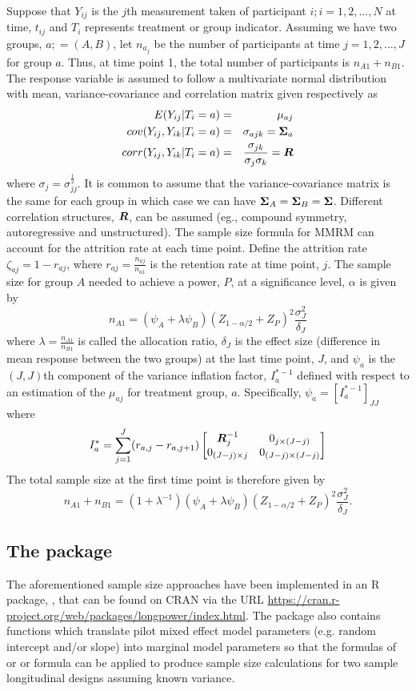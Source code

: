 Suppose that $Y_{ij}$ is the $j$th measurement taken of participant $i; i=1,2,\dots,N$ at time, $t_{ij}$ and $T_i$ represents treatment or group indicator. Assuming we have two groups, $a; =(A,B)$, let $n_{a_j}$ be the number of participants at time $j=1,2,\dots,J$ for group $a$. Thus, at time point 1, the total number of participants is $n_{A1}+n_{B1}$.
The response variable is assumed to follow a multivariate normal distribution with mean, variance-covariance and correlation matrix given respectively as 
\begin{eqnarray*}
E(Y_{ij}|T_i=a)&=&\mu_{aj}\\
cov(Y_{ij}, Y_{ik}|T_i=a)&=&\sigma_{ajk}=\mbox{\boldmath $\Sigma$}_a\\
corr(Y_{ij}, Y_{ik}|T_i=a)&=&\frac{\sigma_{jk}}{\sigma_j\sigma_k}=\mbox{\boldmath $R$}
\end{eqnarray*}
where $\sigma_j=\sigma_{jj}^{\frac{1}{2}}$. It is common to assume that the variance-covariance matrix is the same for each group in which case we can have $\mbox{\boldmath $\Sigma$}_A=\mbox{\boldmath $\Sigma$}_B=\mbox{\boldmath $\Sigma$}$. Different correlation structures, $\mbox{\boldmath $R$}$, can be assumed (eg., compound symmetry, autoregressive and unstructured). The sample size formula for MMRM \citep{Lu_Luo_Chen(2008)} can account for the attrition rate at each time point. Define the attrition rate $\zeta_{aj}=1-r_{aj}$, where $r_{aj}=\frac{n_{aj}}{n_{a1}}$ is the retention rate at time point, $j$. The sample size for group $A$ needed to achieve a power, $P$, at a significance level, $\alpha$ is given by $$n_{A1}=(\psi_A+\lambda\psi_B)(Z_{1-\alpha/2}+Z_{P})^2\frac{\sigma^2_J}{\delta_J}$$
where $\lambda=\frac{n_{A1}}{n_{B1}}$ is called the allocation ratio, $\delta_J$ is the effect size (difference in mean response between the two groups) at the last time point, $J$, and $\psi_a$ is  the $(J, J)$th component of the variance inflation factor, $I_a^{*-1}$ defined with respect to an estimation of the $\mu_{aj}$ for treatment group, $a$. Specifically, $\psi_a=\left[I_a^{*-1}\right]_{JJ}$ where $$I_a^*=\sum_{j=1}^{J}(r_{a,j}-r_{a,j+1})\begin{bmatrix}
\mbox{\boldmath $R$}_j^{-1}&0_{j\times (J-j)}\\0_{(J-j)\times j}&0_{(J-j)\times (J-j)}
\end{bmatrix}$$
The total sample size at the first time point is therefore given by $$n_{A1}+n_{B1}=(1+\lambda^{-1})(\psi_A+\lambda\psi_B)(Z_{1-\alpha/2}+Z_{P})^2\frac{\sigma^2_J}{\delta_J}.$$


\subsection{The  package}
\label{model3}
The aforementioned sample size approaches have been implemented in an R package,  \citep{Donohue_Edland(2020)}, that can be found on CRAN via the URL \url{https://cran.r-project.org/web/packages/longpower/index.html}. The package also contains functions which translate pilot mixed effect model parameters (e.g. random intercept and/or slope) into marginal model parameters so that the formulas of \cite{Diggle_etal(2002)}  or \cite{Liu_Liang(1997)} or \cite{Lu_Luo_Chen(2008)} formula can be applied to produce sample size calculations for two sample longitudinal designs assuming known variance.


